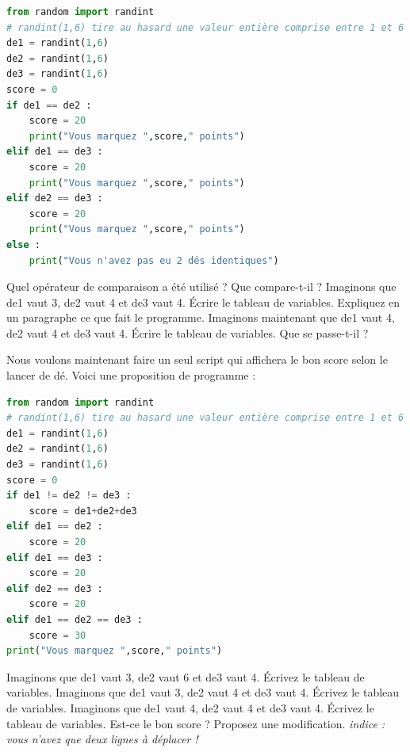 \begin{Exercise}[title={Test des 2 dés identiques}]
\begin{lstlisting}[style=pythonstyle, language=Python]
from random import randint
# randint(1,6) tire au hasard une valeur entière comprise entre 1 et 6
de1 = randint(1,6)
de2 = randint(1,6)
de3 = randint(1,6)
score = 0
if de1 == de2 :
    score = 20
    print("Vous marquez ",score," points")
elif de1 == de3 :
    score = 20
    print("Vous marquez ",score," points")
elif de2 == de3 :
    score = 20
    print("Vous marquez ",score," points")
else :
    print("Vous n'avez pas eu 2 dés identiques")
\end{lstlisting}
\Question Quel opérateur de comparaison a été utilisé ? Que compare-t-il ?
\Question Imaginons que de1 vaut 3, de2 vaut 4 et de3 vaut 4. Écrire le tableau de variables.
\Question Expliquez en un paragraphe ce que fait le programme.
\Question Imaginons maintenant que de1 vaut 4, de2 vaut 4 et de3 vaut 4. Écrire le tableau de variables. Que se passe-t-il ?
\end{Exercise}

\newpage
\begin{Exercise}[title={Test des 2 dés identiques}]
Nous voulons maintenant faire un seul script qui affichera le bon score selon le lancer de dé. Voici une proposition de programme :


\begin{lstlisting}[style=pythonstyle, language=Python]
from random import randint
# randint(1,6) tire au hasard une valeur entière comprise entre 1 et 6
de1 = randint(1,6)
de2 = randint(1,6)
de3 = randint(1,6)
score = 0
if de1 != de2 != de3 :
    score = de1+de2+de3
elif de1 == de2 :
    score = 20
elif de1 == de3 :
    score = 20
elif de2 == de3 :
    score = 20
elif de1 == de2 == de3 :
    score = 30
print("Vous marquez ",score," points")
\end{lstlisting}
\Question Imaginons que de1 vaut 3, de2 vaut 6 et de3 vaut 4. Écrivez le tableau de variables.
\Question Imaginons que de1 vaut 3, de2 vaut 4 et de3 vaut 4. Écrivez le tableau de variables.
\Question Imaginons que de1 vaut 4, de2 vaut 4 et de3 vaut 4. Écrivez le tableau de variables.
\Question Est-ce le bon score ? Proposez une modification. \textit{indice : vous n'avez que deux lignes à déplacer !}
\end{Exercise}

